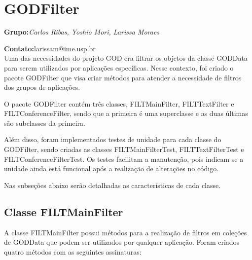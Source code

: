\section{GODFilter}

\textbf{Grupo:}\textit{Carlos Ribas, Yoshio Mori, Larissa Moraes}

\textbf{Contato:}larissam@ime.usp.br\\

Uma das necessidades do projeto GOD era filtrar os objetos da classe GODData para serem utilizados por aplicações específicas. Nesse contexto, foi criado o pacote GODFilter que visa criar métodos para atender a necessidade de filtros dos grupos de aplicações.

O pacote GODFilter contém três classes, FILTMainFilter, FILTTextFilter e FILTConferenceFilter, sendo que a primeira é uma superclasse e as duas últimas são subclasses da primeira. 

Além disso, foram implementados testes de unidade para cada classe do GODFilter, sendo criadas as classes FILTMainFilterTest, FILTTextFilterTest e FILTConferenceFilterTest. Os testes facilitam a manutenção, pois indicam se a unidade ainda está funcional após a realização de alterações no código.

Nas subseções abaixo serão detalhadas as características de cada classe.

\subsection{Classe FILTMainFilter}

A classe FILTMainFilter possui métodos para a realização de filtros em coleções de GODData que podem ser utilizados por qualquer aplicação. 
Foram criados quatro métodos com as seguintes assinaturas:

